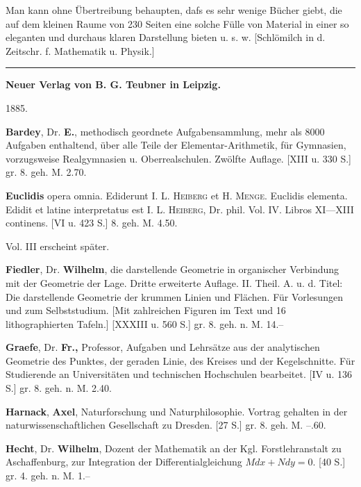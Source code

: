 \documentclass[11pt]{article}
\begin{document}
\glqq{}Man kann ohne \"Ubertreibung behaupten, dafs es sehr wenige B\"ucher giebt, die auf dem kleinen Raume von 230 Seiten eine solche F\"ulle von Material in einer so eleganten und durchaus klaren Darstellung bieten u. s. w.\grqq{} \hfill [Schl\"omilch in d. Zeitschr. f. Mathematik u. Physik.]

\rule{6em}{0.4pt}



\textbf{Neuer Verlag von B. G. Teubner in Leipzig.}

1885.

\textbf{Bardey}, Dr. \textbf{E.}, methodisch geordnete Aufgabensammlung, mehr als 8000 Aufgaben enthaltend, \"uber alle Teile der Elementar-Arithmetik, f\"ur Gymnasien, vorzugsweise Realgymnasien u. Oberrealschulen. Zw\"olfte Auflage. [XIII u. 330 S.] gr. 8. geh. M. 2.70.

\textbf{Euclidis} opera omnia. Ediderunt I. L. \textsc{Heiberg} et H. \textsc{Menge}. Euclidis elementa. Edidit et latine interpretatus est I. L. \textsc{Heiberg}, Dr. phil. Vol. IV. Libros XI---XIII continens. [VI u. 423 S.] 8. geh. M. 4.50.

Vol. III erscheint sp\"ater.

\textbf{Fiedler}, Dr. \textbf{Wilhelm}, die darstellende Geometrie in organischer Verbindung mit der Geometrie der Lage. Dritte erweiterte Auflage. II. Theil. A. u. d. Titel: Die darstellende Geometrie der krummen Linien und Fl\"achen. F\"ur Vorlesungen und zum Selbststudium. [Mit zahlreichen Figuren im Text und 16 lithographierten Tafeln.] [XXXIII u. 560 S.] gr. 8. geh. n. M. 14.--

\textbf{Graefe}, Dr. \textbf{Fr.,} Professor, Aufgaben und Lehrs\"atze aus der analytischen Geometrie des Punktes, der geraden Linie, des Kreises und der Kegelschnitte. F\"ur Studierende an Universit\"aten und technischen Hochschulen bearbeitet. [IV u. 136 S.] gr. 8. geh. n. M. 2.40.

\textbf{Harnack}, \textbf{Axel}, Naturforschung und Naturphilosophie. Vortrag gehalten in der naturwissenschaftlichen Gesellschaft zu Dresden. [27 S.] gr. 8. geh. M. --.60.

\textbf{Hecht}, Dr. \textbf{Wilhelm}, Dozent der Mathematik an der Kgl. Forstlehranstalt zu Aschaffenburg, zur Integration der Differentialgleichung $Mdx + Ndy = 0$. [40 S.] gr. 4. geh. n. M. 1.--
\end{document}
